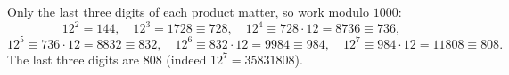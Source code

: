 Only the last three digits of each product matter, so work modulo $1000$:
\[
12^2=144,\quad 12^3=1728\equiv728,\quad 12^4\equiv728\cdot12=8736\equiv736,
\]
\[
12^5\equiv736\cdot12=8832\equiv832,\quad 12^6\equiv832\cdot12=9984\equiv984,\quad 12^7\equiv984\cdot12=11808\equiv808 .
\]
The last three digits are $\boxed{808}$ (indeed $12^7=35831808$).
